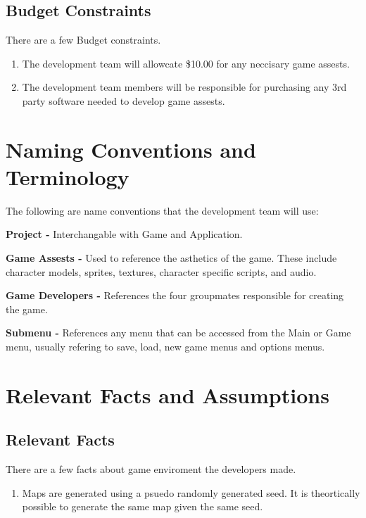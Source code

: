 \documentclass{article}
\begin{document}
\subsection{Budget Constraints}
\quad There are a few Budget constraints.
\begin{enumerate}[{BC}1. ]
	\item The development team will allowcate \$10.00 for any neccisary game assests.
	\item The development team members will be responsible for purchasing any 3rd party software needed to develop game assests.
\end{enumerate}
\section{Naming Conventions and Terminology}
\quad The following are name conventions that the development team will use: \par
\textbf{Project - }Interchangable with Game and Application. \par
\textbf{Game Assests - }Used to reference the asthetics of the game. These include character models, sprites, textures, character specific scripts, and audio. \par
\textbf{Game Developers - }References the four groupmates responsible for creating the game. \par
\textbf{Submenu - }References any menu that can be accessed from the Main or Game menu, usually refering to save, load, new game menus and options menus. \par
\section{Relevant Facts and Assumptions}
\subsection{Relevant Facts}
\quad There are a few facts about game enviroment the developers made.
\begin{enumerate}[{RF}1. ]
	\item Maps are generated using a psuedo randomly generated seed. It is theortically possible to generate the same map given the same seed.
\end{enumerate}
\end{document}
